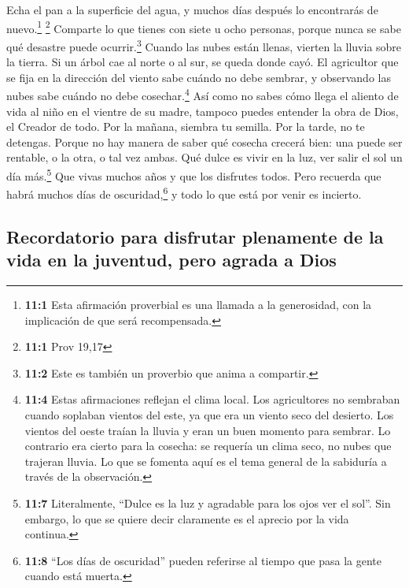  Echa el pan a la superficie del agua, y muchos días
después lo encontrarás de nuevo.\footnote{\textbf{11:1} Esta afirmación
  proverbial es una llamada a la generosidad, con la implicación de que
  será recompensada.} \footnote{\textbf{11:1} Prov 19,17} 
Comparte lo que tienes con siete u ocho personas, porque nunca se sabe
qué desastre puede ocurrir.\footnote{\textbf{11:2} Este es también un
  proverbio que anima a compartir.}  Cuando las nubes
están llenas, vierten la lluvia sobre la tierra. Si un árbol cae al
norte o al sur, se queda donde cayó.  El agricultor que se
fija en la dirección del viento sabe cuándo no debe sembrar, y
observando las nubes sabe cuándo no debe cosechar.\footnote{\textbf{11:4}
  Estas afirmaciones reflejan el clima local. Los agricultores no
  sembraban cuando soplaban vientos del este, ya que era un viento seco
  del desierto. Los vientos del oeste traían la lluvia y eran un buen
  momento para sembrar. Lo contrario era cierto para la cosecha: se
  requería un clima seco, no nubes que trajeran lluvia. Lo que se
  fomenta aquí es el tema general de la sabiduría a través de la
  observación.}  Así como no sabes cómo llega el aliento
de vida al niño en el vientre de su madre, tampoco puedes entender la
obra de Dios, el Creador de todo.  Por la mañana, siembra
tu semilla. Por la tarde, no te detengas. Porque no hay manera de saber
qué cosecha crecerá bien: una puede ser rentable, o la otra, o tal vez
ambas.  Qué dulce es vivir en la luz, ver salir el sol un
día más.\footnote{\textbf{11:7} Literalmente, ``Dulce es la luz y
  agradable para los ojos ver el sol''. Sin embargo, lo que se quiere
  decir claramente es el aprecio por la vida continua.} 
Que vivas muchos años y que los disfrutes todos. Pero recuerda que habrá
muchos días de oscuridad,\footnote{\textbf{11:8} ``Los días de
  oscuridad'' pueden referirse al tiempo que pasa la gente cuando está
  muerta.} y todo lo que está por venir es incierto.

\hypertarget{recordatorio-para-disfrutar-plenamente-de-la-vida-en-la-juventud-pero-agrada-a-dios}{%
\subsection{Recordatorio para disfrutar plenamente de la vida en la
juventud, pero agrada a
Dios}\label{recordatorio-para-disfrutar-plenamente-de-la-vida-en-la-juventud-pero-agrada-a-dios}}

